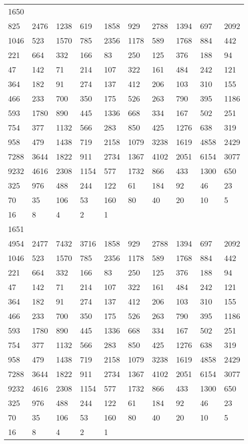 \begin{longtable}{*{10}{l}}
1650&&&&&&&&&\\
825& 2476& 1238& 619& 1858& 929& 2788& 1394& 697& 2092\\
1046& 523& 1570& 785& 2356& 1178& 589& 1768& 884& 442\\
221& 664& 332& 166& 83& 250& 125& 376& 188& 94\\
47& 142& 71& 214& 107& 322& 161& 484& 242& 121\\
364& 182& 91& 274& 137& 412& 206& 103& 310& 155\\
466& 233& 700& 350& 175& 526& 263& 790& 395& 1186\\
593& 1780& 890& 445& 1336& 668& 334& 167& 502& 251\\
754& 377& 1132& 566& 283& 850& 425& 1276& 638& 319\\
958& 479& 1438& 719& 2158& 1079& 3238& 1619& 4858& 2429\\
7288& 3644& 1822& 911& 2734& 1367& 4102& 2051& 6154& 3077\\
9232& 4616& 2308& 1154& 577& 1732& 866& 433& 1300& 650\\
325& 976& 488& 244& 122& 61& 184& 92& 46& 23\\
70& 35& 106& 53& 160& 80& 40& 20& 10& 5\\
16& 8& 4& 2& 1& \\

1651&&&&&&&&&\\
4954& 2477& 7432& 3716& 1858& 929& 2788& 1394& 697& 2092\\
1046& 523& 1570& 785& 2356& 1178& 589& 1768& 884& 442\\
221& 664& 332& 166& 83& 250& 125& 376& 188& 94\\
47& 142& 71& 214& 107& 322& 161& 484& 242& 121\\
364& 182& 91& 274& 137& 412& 206& 103& 310& 155\\
466& 233& 700& 350& 175& 526& 263& 790& 395& 1186\\
593& 1780& 890& 445& 1336& 668& 334& 167& 502& 251\\
754& 377& 1132& 566& 283& 850& 425& 1276& 638& 319\\
958& 479& 1438& 719& 2158& 1079& 3238& 1619& 4858& 2429\\
7288& 3644& 1822& 911& 2734& 1367& 4102& 2051& 6154& 3077\\
9232& 4616& 2308& 1154& 577& 1732& 866& 433& 1300& 650\\
325& 976& 488& 244& 122& 61& 184& 92& 46& 23\\
70& 35& 106& 53& 160& 80& 40& 20& 10& 5\\
16& 8& 4& 2& 1& \\


\end{longtable}
